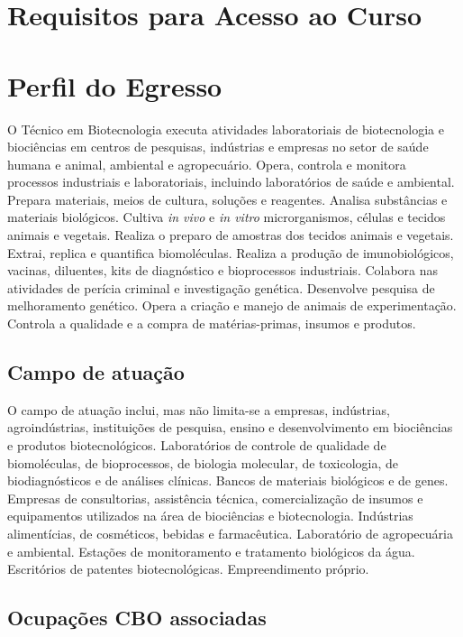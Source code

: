 \documentclass[11pt,fleqn]{book} %
\begin{document}
\section{Requisitos para Acesso ao Curso}



\section{Perfil do Egresso}
\indent

O Técnico em Biotecnologia executa atividades laboratoriais de biotecnologia e biociências em centros de pesquisas, indústrias e empresas no setor de saúde humana e animal, ambiental e agropecuário. 
Opera, controla e monitora processos industriais e laboratoriais, incluindo laboratórios de saúde e ambiental. 
Prepara materiais, meios de cultura, soluções e reagentes. 
Analisa substâncias e materiais biológicos. 
Cultiva \textit{in vivo} e \textit{in vitro} microrganismos, células e tecidos animais e vegetais. 
Realiza o preparo de amostras dos tecidos animais e vegetais. 
Extrai, replica e quantifica biomoléculas.
Realiza a produção de imunobiológicos, vacinas, diluentes, kits de diagnóstico e bioprocessos industriais. 
Colabora nas atividades de perícia criminal e investigação genética. 
Desenvolve pesquisa de melhoramento genético. 
Opera a criação e manejo de animais de experimentação. 
Controla a qualidade e a compra de matérias-primas, insumos e produtos.

\subsection{Campo de atuação}
\indent

O campo de atuação inclui, mas não limita-se a empresas, indústrias, agroindústrias, instituições de pesquisa, ensino e desenvolvimento em biociências e produtos biotecnológicos.
Laboratórios de controle de qualidade de biomoléculas, de bioprocessos, de biologia molecular, de toxicologia, de biodiagnósticos e de análises clínicas. 
Bancos de materiais biológicos e de genes. 
Empresas de consultorias, assistência técnica, comercialização de insumos e equipamentos utilizados na área de biociências e biotecnologia. 
Indústrias alimentícias, de cosméticos, bebidas e farmacêutica. 
Laboratório de agropecuária e ambiental. 
Estações de monitoramento e tratamento biológicos da água. 
Escritórios de patentes biotecnológicas. 
Empreendimento próprio.

\subsection{Ocupações CBO associadas}
\indent
\end{document}
